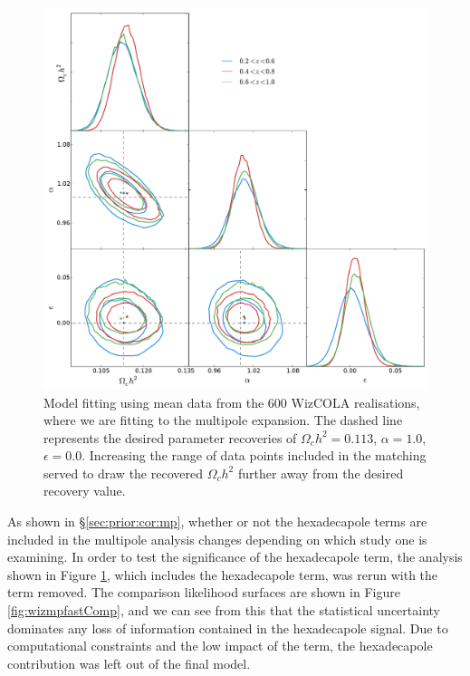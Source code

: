 \documentclass[titlesmallcaps, examinerscopy, copyrightpage]{uqthesis}
\begin{document}
\begin{figure}[h!]
  \begin{center}
    \includegraphics[width=\textwidth]{images/wizmp.pdf}
  \end{center}
  \caption{Model fitting using mean data from the 600 WizCOLA realisations, where we are fitting to the multipole expansion. The dashed line represents the desired parameter recoveries of $\Omega_c h^2 = 0.113$, $\alpha=1.0$, $\epsilon=0.0$. Increasing the range of data points included in the matching served to draw the recovered $\Omega_c h^2$ further away from the desired recovery value.}
  \label{fig:wizmp}
\end{figure}

As shown in \S\ref{sec:prior:cor:mp}, whether or not the hexadecapole terms are included in the multipole analysis changes depending on which study one is examining. In order to test the significance of the hexadecapole term, the analysis shown in Figure \ref{fig:wizmp}, which includes the hexadecapole term, was rerun with the term removed. The comparison likelihood surfaces are shown in Figure \ref{fig:wizmpfastComp}, and we can see from this that the statistical uncertainty dominates any loss of information contained in the hexadecapole signal. Due to computational constraints and the low impact of the term, the hexadecapole contribution was left out of the final model.\\
\end{document}
